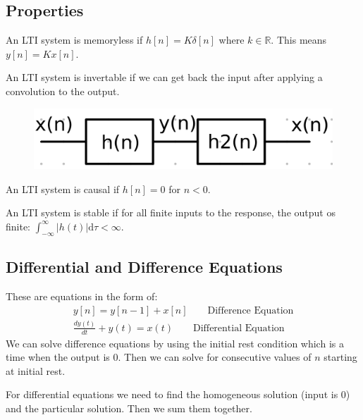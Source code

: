 \documentclass[12pt,letterpaper]{article} \usepackage{amsmath} \usepackage{graphicx} \usepackage[margin=1in]{geometry} \usepackage{longtable}  \usepackage{amssymb}
\begin{document}
	\subsection{Properties}
	An LTI system is memoryless if $h[n] = K\delta[n]$ where $k \in \mathbb R$. This means $y[n] = Kx[n]$.
	
	An LTI system is invertable if we can get back the input after applying a convolution to the output. 
	\begin{figure}[H]
		\centering
		\includegraphics[width=0.4\linewidth]{images/invertability}
		\label{fig:invertability}
	\end{figure}
	
	An LTI system is causal if $h[n] = 0$ for $n < 0$.
	
	An LTI system is stable if for all finite inputs to the response, the output os finite: $\int^{\infty}_{-\infty} |h(t)|\mathrm d \tau < \infty$.
	\subsection{Differential and Difference Equations}
	These are equations in the form of:
	\begin{align*}
		y[n] = y[n-1] + x[n] \qquad \text{Difference Equation}\\
		\frac{dy(t)}{dt} + y(t) = x(t) \qquad \text{Differential Equation}
	\end{align*}
	We can solve difference equations by using the initial rest condition which is a time when the output is 0. Then we can solve for consecutive values of $n$ starting at initial rest. 
	
	For differential equations we need to find the homogeneous solution (input is 0) and the particular solution. Then we sum them together. 
	
\end{document}
